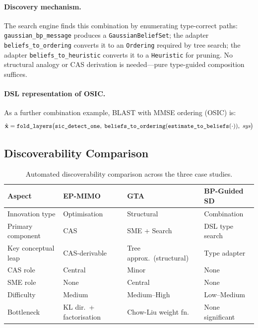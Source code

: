 \documentclass[12pt,a4paper]{article}
\newcommand{\bx}{\mathbf{x}}
\begin{document}
\paragraph{Discovery mechanism.}
The search engine finds this combination by enumerating type-correct paths:
\texttt{gaussian\_bp\_message} produces a \texttt{GaussianBeliefSet};
the adapter \texttt{beliefs\_to\_ordering} converts it to an \texttt{Ordering}
required by tree search; the adapter \texttt{beliefs\_to\_heuristic} converts
it to a \texttt{Heuristic} for pruning.  No structural analogy or CAS
derivation is needed---pure type-guided composition suffices.

\paragraph{DSL representation of OSIC.}
As a further combination example, BLAST with MMSE ordering (OSIC) is:
\begin{equation}
  \hat{\bx} = \texttt{fold\_layers}\bigl(\texttt{sic\_detect\_one},\;
              \texttt{beliefs\_to\_ordering}(\texttt{estimate\_to\_beliefs}(\cdot)),\;
              \textit{sys}\bigr) \notag
\end{equation}

\subsection{Discoverability Comparison}

\begin{table}[H]
  \centering
  \caption{Automated discoverability comparison across the three case studies.}
  \label{tab:discoverability}
  \small
  \begin{tabular}{@{}p{3.0cm}p{3.0cm}p{3.0cm}p{3.5cm}@{}}
    \toprule
    \textbf{Aspect} & \textbf{EP-MIMO} & \textbf{GTA} & \textbf{BP-Guided SD} \\
    \midrule
    Innovation type & Optimisation & Structural & Combination \\
    Primary component & CAS & SME + Search & DSL type search \\
    Key conceptual leap & CAS-derivable & Tree approx.\ (structural) & Type adapter \\
    CAS role & Central & Minor & None \\
    SME role & None & Central & None \\
    Difficulty & Medium & Medium--High & Low--Medium \\
    Bottleneck & KL dir.\ + factorisation & Chow-Liu weight fn.\ & None significant \\
    \bottomrule
  \end{tabular}
\end{table}
\end{document}
